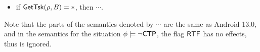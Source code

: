 {\begin{itemize}
\begin{itemize}
\begin{itemize}
\begin{itemize}
\begin{itemize}
\begin{itemize}
\begin{itemize}
                    \item if $\phi\models\stpflag$ and $A = B$, or $\phi \models\stpflag\wedge\pitflag$ and $\preact(\rho) = B$, then $\rho' = \rho$ and $b' = b$, 
                    \item otherwise, $b' = \nohflag$ iff $\phi \models \nohflag$, moreover, 
                    \begin{itemize}
                        \item if $b = \neg \nohflag$, then $\rho'=\push(\rho, B)$,
                        \item otherwise, $\rho' = \rmact(\push(\rho, B), 1, 2)$, 
                    \end{itemize}
                \end{itemize}
            \end{itemize}
        \end{itemize}
    \end{itemize}
\end{itemize}
\item if $\mathsf{GetTsk}(\rho, B) = *$, then $\cdots$. 
\end{itemize}
\end{itemize}
}
Note that the parts of the semantics denoted by $\cdots$ are the same as Android 13.0, and in the semantics for the situation $\phi \models \neg {\sf CTP}$, the flag ${\sf RTF}$ has no effects, thus is ignored.  




